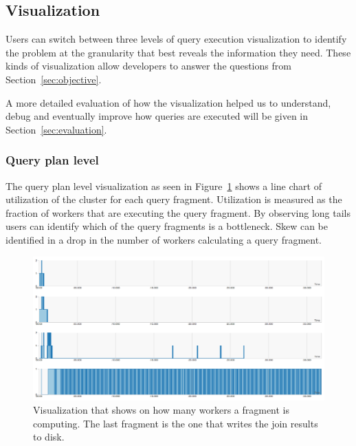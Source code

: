 \documentclass[11pt]{scrartcl}
\begin{document}
\subsection{Visualization}
\label{sec:visualization}

Users can switch between three levels of query execution visualization to identify the problem at the granularity that best reveals the information they need. These kinds of visualization allow developers to answer the questions from Section~\ref{sec:objective}.


A more detailed evaluation of how the visualization helped us to understand, debug and eventually improve how queries are executed will be given in Section~\ref{sec:evaluation}.

\subsubsection{Query plan level}

The query plan level visualization as seen in Figure~\ref{fig:frags} shows a line chart of utilization of the cluster for each query fragment. Utilization is measured as the fraction of workers that are executing the query fragment. By observing long tails users can identify which of the query fragments is a bottleneck. Skew can be identified in a drop in the number of workers calculating a query fragment.

\begin{figure}[h]
  \begin{center}
    \includegraphics[width=\textwidth]{fragments_lines}
  \end{center}
  \caption{Visualization that shows on how many workers a fragment is computing. The last fragment is the one that writes the join results to disk.}
  \label{fig:frags}
\end{figure}
\end{document}
